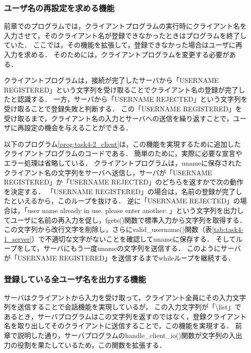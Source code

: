 \documentclass[a4j,10pt]{jarticle}
\begin{document}



\subsubsection{ユーザ名の再設定を求める機能}
前章でのプログラムでは，クライアントプログラムの実行時にクライアント名を入力させて，そのクライアント名が登録できなかったときはプログラムを終了していた．
ここでは，その機能を拡張して，登録できなかった場合はユーザに再入力を求める．
そのためには，クライアントプログラムを変更する必要がある．

クライアントプログラムは，接続が完了したサーバから「USERNAME REGISTERED」という文字列を受け取ることでクライアント名の登録が完了したと認識する．
一方，サーバから「USERNAME REJECTED」という文字列を受け取ることで登録失敗と判断する．
この「USERNAME REGISTERED」を受け取るまで，クライアント名の入力とサーバへの送信を繰り返すことで，ユーザに再設定の機会を与えることができる．

以下のプログラム\ref{prog:task4-2_client}は，この機能を実現するために追加したクライアントプログラムのコードである．
簡単のために，実際に必要な宣言やエラー処理は省略している．
クライアントプログラムは，unameに保存されたクライアント名の文字列をサーバへ送信し，サーバが「USERNAME REGISTERED」か「USERNAME REJECTED」のどちらを返すかで次の動作を決定する．
「USERNAME REGISTERED」の場合は，名前の登録が完了したといえるから，このループを抜ける．
逆に「USERNAME REJECTED」の場合は，「user name already in use. please enter another: 」という文字列を出力してユーザに名前の再入力を促し，fgets()関数で標準入力から文字列を取得する．
この文字列から改行文字を削除し，さらにvalid\_username()関数（表\ref{tab:task4-1_server}）で不適切な文字がないことを確認してunameに保存する．
そしてループをして，サーバにもう一度unameの文字列を送信する．
このようにサーバが「USERNAME REGISTERED」を送信するまでwhileループを継続する．



\subsubsection{登録している全ユーザ名を出力する機能}
サーバはクライアントから入力を受け取って，クライアント全員にその入力文字列を送信することで会話機能を実現しているが，
この入力文字列が「\textbackslash list」であるとき，サーバプログラムはこの文字列を返すのではなく，登録クライアント名を取り出してそのクライアントに送信することで，この機能を実現する．
前章で説明した通り，サーバプログラムのhandle\_client\_io()関数が文字列の入出力の役割を果たしているため，この関数を拡張する．
\end{document}
